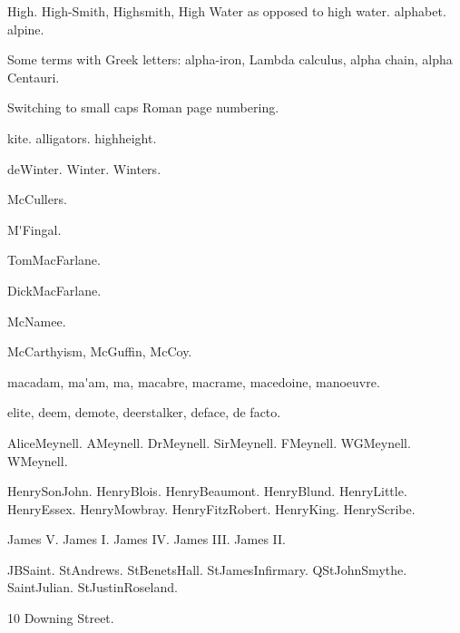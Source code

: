 \documentclass{article}
\newcommand*{\myscroman}[1]{%
  \myscromannum{\value{#1}}%
}
\newcommand*{\myscromannum}[1]{%
  \textsc{\romannumeral#1}%
}
\begin{document}
\gls{High}. \gls{High-Smith}, \gls{Highsmith}, \gls{High Water}
as opposed to \gls{high water}. \Gls{alphabet}. \Gls{alpine}.

Some terms with Greek letters: \gls{alpha-iron}, 
\gls{Lambda calculus}, \gls{alpha chain}, \gls{alpha Centauri}.

\newpage

\renewcommand{\thepage}{\myscroman{page}}%
Switching to small caps Roman page numbering.

\Gls{kite}. \Glspl{alligator}. \Gls{highheight}.

\gls{deWinter}.
\gls{Winter}.
\gls{Winters}.

\gls{McCullers}.

\gls{M'Fingal}.

\gls{TomMacFarlane}.

\gls{DickMacFarlane}.

\gls{McNamee}.

\gls{McCarthyism},
\gls{McGuffin},
\gls{McCoy}.

\Gls{macadam},
\gls{ma'am},
\gls{ma},
\gls{macabre},
\gls{macrame},
\gls{macedoine},
\gls{manoeuvre}.

\Gls{elite},
\gls{deem},
\gls{demote},
\gls{deerstalker},
\gls{deface},
\gls{de facto}.


\gls{AliceMeynell}.
\gls{AMeynell}.
\gls{DrMeynell}.
\gls{SirMeynell}.
\gls{FMeynell}.
\gls{WGMeynell}.
\gls{WMeynell}.

\gls{HenrySonJohn}. \gls{HenryBlois}.
\gls{HenryBeaumont}. \gls{HenryBlund}.
\gls{HenryLittle}. \gls{HenryEssex}. \gls{HenryMowbray}.
\gls{HenryFitzRobert}.
\gls{HenryKing}. \gls{HenryScribe}.

\gls{James V}.
\gls{James I}.
\gls{James IV}.
\gls{James III}.
\gls{James II}.

\gls{JBSaint}.
\gls{StAndrews}.
\gls{StBenetsHall}.
\gls{StJamesInfirmary}.
\gls{QStJohnSmythe}.
\gls{SaintJulian}.
\gls{StJustinRoseland}.

\gls{10 Downing Street}.

\newpage


\printterms
 [
   heading={\section[Word Sorted Index]},%
   database=index,%
   prelocation=dotfill,%
   columns=3,%
   style=index,%
   postheading={Locations in bold indicate primary reference.
   (Word sort.)}
 ]
\end{document}
